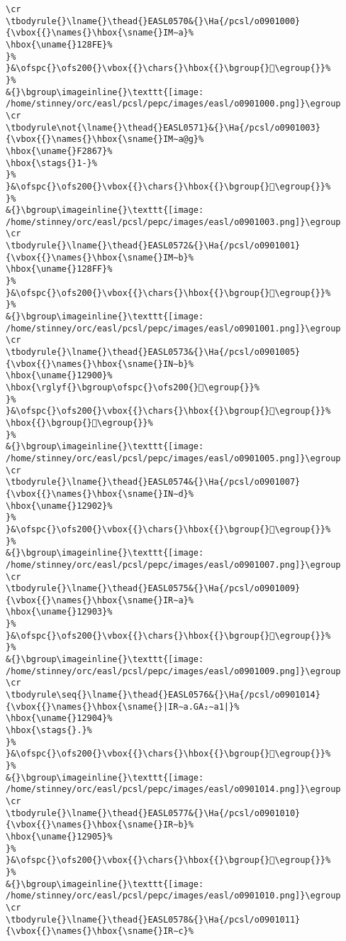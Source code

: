 \begin{verbatim}
\cr
\tbodyrule{}\lname{}\thead{}EASL0570&{}\Ha{/pcsl/o0901000}{\vbox{{}\names{}\hbox{\sname{}IM∼a}%
\hbox{\uname{}128FE}%
}%
}&\ofspc{}\ofs200{}\vbox{{}\chars{}\hbox{{}\bgroup{}𒣾\egroup{}}%
}%
&{}\bgroup\imageinline{}\texttt{[image: /home/stinney/orc/easl/pcsl/pepc/images/easl/o0901000.png]}\egroup
\cr
\tbodyrule\not{\lname{}\thead{}EASL0571}&{}\Ha{/pcsl/o0901003}{\vbox{{}\names{}\hbox{\sname{}IM∼a@g}%
\hbox{\uname{}F2867}%
\hbox{\stags{}1-}%
}%
}&\ofspc{}\ofs200{}\vbox{{}\chars{}\hbox{{}\bgroup{}󲡧\egroup{}}%
}%
&{}\bgroup\imageinline{}\texttt{[image: /home/stinney/orc/easl/pcsl/pepc/images/easl/o0901003.png]}\egroup
\cr
\tbodyrule{}\lname{}\thead{}EASL0572&{}\Ha{/pcsl/o0901001}{\vbox{{}\names{}\hbox{\sname{}IM∼b}%
\hbox{\uname{}128FF}%
}%
}&\ofspc{}\ofs200{}\vbox{{}\chars{}\hbox{{}\bgroup{}𒣿\egroup{}}%
}%
&{}\bgroup\imageinline{}\texttt{[image: /home/stinney/orc/easl/pcsl/pepc/images/easl/o0901001.png]}\egroup
\cr
\tbodyrule{}\lname{}\thead{}EASL0573&{}\Ha{/pcsl/o0901005}{\vbox{{}\names{}\hbox{\sname{}IN∼b}%
\hbox{\uname{}12900}%
\hbox{\rglyf{}\bgroup\ofspc{}\ofs200{}𒤀\egroup{}}%
}%
}&\ofspc{}\ofs200{}\vbox{{}\chars{}\hbox{{}\bgroup{}𒤀\egroup{}}%
\hbox{{}\bgroup{}𒤁\egroup{}}%
}%
&{}\bgroup\imageinline{}\texttt{[image: /home/stinney/orc/easl/pcsl/pepc/images/easl/o0901005.png]}\egroup
\cr
\tbodyrule{}\lname{}\thead{}EASL0574&{}\Ha{/pcsl/o0901007}{\vbox{{}\names{}\hbox{\sname{}IN∼d}%
\hbox{\uname{}12902}%
}%
}&\ofspc{}\ofs200{}\vbox{{}\chars{}\hbox{{}\bgroup{}𒤂\egroup{}}%
}%
&{}\bgroup\imageinline{}\texttt{[image: /home/stinney/orc/easl/pcsl/pepc/images/easl/o0901007.png]}\egroup
\cr
\tbodyrule{}\lname{}\thead{}EASL0575&{}\Ha{/pcsl/o0901009}{\vbox{{}\names{}\hbox{\sname{}IR∼a}%
\hbox{\uname{}12903}%
}%
}&\ofspc{}\ofs200{}\vbox{{}\chars{}\hbox{{}\bgroup{}𒤃\egroup{}}%
}%
&{}\bgroup\imageinline{}\texttt{[image: /home/stinney/orc/easl/pcsl/pepc/images/easl/o0901009.png]}\egroup
\cr
\tbodyrule\seq{}\lname{}\thead{}EASL0576&{}\Ha{/pcsl/o0901014}{\vbox{{}\names{}\hbox{\sname{}|IR∼a.GA₂∼a1|}%
\hbox{\uname{}12904}%
\hbox{\stags{}.}%
}%
}&\ofspc{}\ofs200{}\vbox{{}\chars{}\hbox{{}\bgroup{}𒤄\egroup{}}%
}%
&{}\bgroup\imageinline{}\texttt{[image: /home/stinney/orc/easl/pcsl/pepc/images/easl/o0901014.png]}\egroup
\cr
\tbodyrule{}\lname{}\thead{}EASL0577&{}\Ha{/pcsl/o0901010}{\vbox{{}\names{}\hbox{\sname{}IR∼b}%
\hbox{\uname{}12905}%
}%
}&\ofspc{}\ofs200{}\vbox{{}\chars{}\hbox{{}\bgroup{}𒤅\egroup{}}%
}%
&{}\bgroup\imageinline{}\texttt{[image: /home/stinney/orc/easl/pcsl/pepc/images/easl/o0901010.png]}\egroup
\cr
\tbodyrule{}\lname{}\thead{}EASL0578&{}\Ha{/pcsl/o0901011}{\vbox{{}\names{}\hbox{\sname{}IR∼c}%

\end{verbatim}
